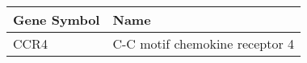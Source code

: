 \begin{tabular}{ll}
\toprule
Gene Symbol &                           Name \\
\midrule
       CCR4 & C-C motif chemokine receptor 4 \\
\bottomrule
\end{tabular}
